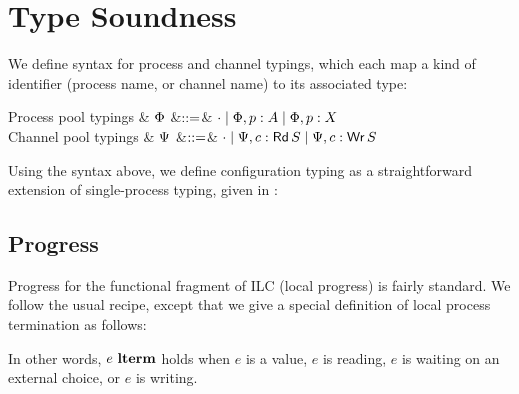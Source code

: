 \section{Type Soundness}
\label{sec:ilcproofs}

We define syntax for process and channel typings, which each map a kind of
identifier (process name, or channel name) to its associated type:

\begin{grammar}
    Process pool typings
    & $\Phi$
    &$\mathrel{::=}$& $\cdot \mathrel{\mid} \Phi,p: A \mathrel{\mid} \Phi,p: X$
    \\
    Channel pool typings
    & $\Psi$
    &$\mathrel{::=}$& $\cdot \mathrel{\mid} \Psi,c:\textnormal{\textsf{Rd}}\,S \mathrel{\mid} \Psi,c:\textnormal{\textsf{Wr}}\,S$
\end{grammar}


Using the syntax above, we define configuration typing as a straightforward extension
of single-process typing, given in :\smallskip


\subsection{Progress}
\label{subsec:label}

Progress for the functional fragment of ILC (local progress) is fairly
standard. We follow the usual recipe, except that we give a special definition
of local process termination as follows:\smallskip

In other words, $e~\textbf{lterm}$ holds when $e$ is a value, $e$ is reading, $e$ is
waiting on an external choice, or $e$ is writing.

